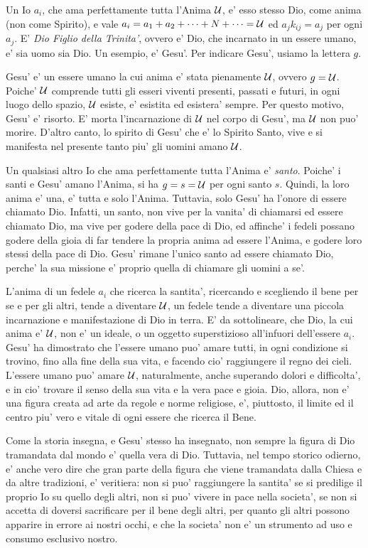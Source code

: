 Un Io $a_i$, che ama perfettamente tutta l'Anima $\mathcal{U}$, e' esso stesso Dio, come anima (non come Spirito), e vale $a_i=a_1+a_2+\cdots+N+\cdots=\mathcal{U}$ ed $a_jk_{ij}=a_j$ per ogni $a_j$.  E' \emph{Dio Figlio della Trinita'}, ovvero e' Dio, che incarnato in un essere umano, e' sia uomo sia Dio. Un esempio, e' Gesu'. Per indicare Gesu', usiamo la lettera $g$.  

Gesu' e' un essere umano la cui anima e' stata pienamente $\mathcal{U}$, ovvero $g=\mathcal{U}$. Poiche' $\mathcal{U}$ comprende tutti gli esseri viventi presenti, passati e futuri, in ogni luogo dello spazio, $\mathcal{U}$ esiste, e' esistita ed esistera' sempre. Per questo motivo, Gesu' e' risorto. E' morta l'incarnazione di $\mathcal{U}$ nel corpo di Gesu', ma $\mathcal{U}$ non puo' morire. D'altro canto, lo spirito di Gesu' che e' lo Spirito Santo, vive e si manifesta nel presente tanto piu' gli uomini amano $\mathcal{U}$.

Un qualsiasi altro Io che ama perfettamente tutta l'Anima e' \emph{santo}. Poiche' i santi e Gesu' amano l'Anima, si ha $g=s=\mathcal{U}$ per ogni santo $s$. Quindi, la loro anima e' una, e' tutta e solo l'Anima. Tuttavia, solo Gesu' ha l'onore di essere chiamato Dio. Infatti, un santo, non vive per la vanita' di chiamarsi ed essere chiamato Dio, ma vive per godere della pace di Dio, ed affinche' i fedeli possano godere della gioia di far tendere la propria anima ad essere l'Anima, e godere loro stessi della pace di Dio. Gesu' rimane l'unico santo ad essere chiamato Dio, perche' la sua missione e' proprio quella di chiamare gli uomini a se'.

L'anima di un fedele $a_i$ che ricerca la santita', ricercando e scegliendo il bene per se e per gli altri, tende a diventare $\mathcal{U}$, un fedele tende a diventare una piccola incarnazione e manifestazione di Dio in terra. E' da sottolineare, che Dio, la cui anima e' $\mathcal{U}$, non e' un ideale, o un oggetto superstizioso all'infuori dell'essere $a_i$. Gesu' ha dimostrato che l'essere umano puo' amare tutti, in ogni condizione si trovino, fino alla fine della sua vita, e facendo cio' raggiungere il regno dei cieli. L'essere umano puo' amare $\mathcal{U}$, naturalmente, anche superando dolori e difficolta', e in cio' trovare il senso della sua vita e la vera pace e gioia. Dio, allora, non e' una figura creata ad arte da regole e norme religiose, e', piuttosto, il limite ed il centro piu' vero e vitale di ogni essere che ricerca il Bene. 

Come la storia insegna, e Gesu' stesso ha insegnato, non sempre la figura di Dio tramandata dal mondo e' quella vera di Dio. Tuttavia, nel tempo storico odierno, e' anche vero dire che gran parte della figura che viene tramandata dalla Chiesa e da altre tradizioni, e' veritiera: non si puo' raggiungere la santita' se si predilige il proprio Io su quello degli altri, non si puo' vivere in pace nella societa',  se non si accetta di doversi sacrificare per il bene degli altri, per quanto gli altri possono apparire in errore ai nostri occhi, e che la societa' non e' un strumento ad uso e consumo esclusivo nostro.

